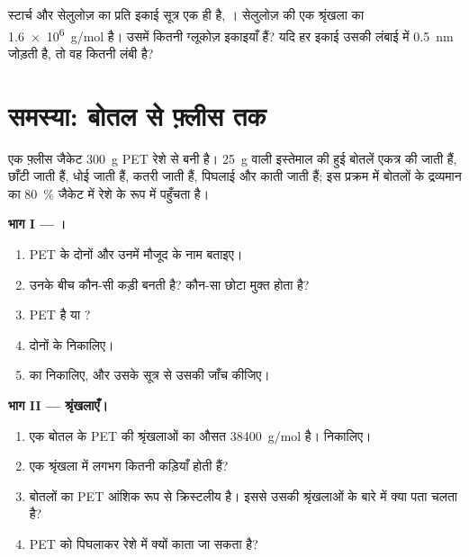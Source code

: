 \begin{exercise}[$\star\star\star$]\label{exo:g12:polymers:15}
स्टार्च और सेलुलोज़ का प्रति इकाई सूत्र एक ही है, ।
सेलुलोज़ की एक श्रृंखला का  \qty{1.6e6}{g/mol} है। उसमें कितनी ग्लूकोज़
इकाइयाँ हैं? यदि हर इकाई उसकी लंबाई में \qty{0.5}{nm} जोड़ती है, तो वह
कितनी लंबी है?
\end{exercise}

\section{समस्या: बोतल से फ़्लीस तक}

\begin{problem}
\label{pb:g12:polymers:1}
एक फ़्लीस जैकेट \qty{300}{g} PET रेशे से बनी है। \qty{25}{g} वाली
इस्तेमाल की हुई बोतलें एकत्र की जाती हैं, छाँटी जाती हैं, धोई जाती हैं, कतरी जाती हैं, पिघलाई और काती जाती हैं;
इस प्रक्रम में बोतलों के द्रव्यमान का \qty{80}{\percent} जैकेट में
रेशे के रूप में पहुँचता है।

\medskip
\noindent\textbf{भाग I --- ।}
\begin{enumerate}
  \item PET के दोनों  और उनमें मौजूद  के नाम
        बताइए।
  \item उनके बीच कौन-सी कड़ी बनती है? कौन-सा छोटा  मुक्त होता है?
  \item PET  है या ?
  \item दोनों  के  निकालिए।
  \item {}  का  निकालिए, और उसके
        सूत्र से उसकी जाँच कीजिए।
\end{enumerate}

\medskip
\noindent\textbf{भाग II --- श्रृंखलाएँ।}
\begin{enumerate}[resume]
  \item एक बोतल के PET की श्रृंखलाओं का औसत 
        \qty{38400}{g/mol} है।  निकालिए।
  \item एक श्रृंखला में लगभग कितनी  कड़ियाँ होती हैं?
  \item बोतलों का PET आंशिक रूप से क्रिस्टलीय है। इससे उसकी
        श्रृंखलाओं के बारे में क्या पता चलता है?
  \item PET को पिघलाकर रेशे में क्यों काता जा सकता है?
\end{enumerate}


\end{problem}
